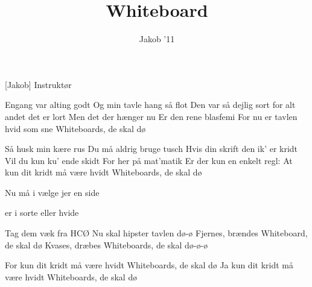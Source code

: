 \documentclass[a4paper,11pt]{article}
\title{Whiteboard}
\author{Jakob '11}
\begin{document}
\maketitle

\begin{roles}
[Jakob] Instruktør
\end{roles}

\begin{song}
 Engang var alting godt
Og min tavle hang så flot
Den var så dejlig sort
for alt andet det er lort
Men det der hænger nu
Er den rene blasfemi
For nu er tavlen hvid som sne
Whiteboards, de skal dø

 Så husk min kære rus
Du må aldrig bruge tusch
Hvis din skrift den ik' er kridt
Vil du kun ku' ende skidt
For her på mat'matik
Er der kun en enkelt regl:
At kun dit kridt må være hvidt
Whiteboards, de skal dø

 Nu må i vælge jer en side %

er i sorte eller hvide %

Tag dem væk fra HCØ
Nu skal hipster tavlen dø-ø
Fjernes, brændes 
Whiteboard, de skal dø
Kvases, dræbes
Whiteboards, de skal dø-ø-ø

 For kun dit kridt må være hvidt
Whiteboards, de skal dø
Ja kun dit kridt må være hvidt
Whiteboards, de skal dø

\end{song}
\end{document}
